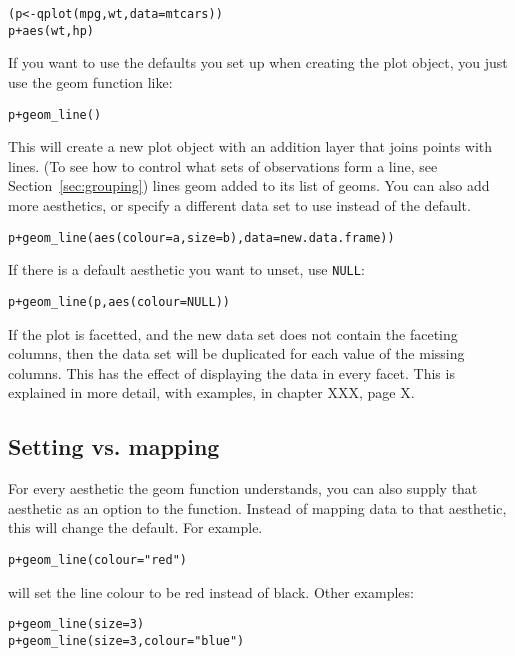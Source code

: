 \begin{alltt}
(p <- qplot(mpg, wt, data=mtcars))
p + aes(wt, hp)
\end{alltt}

If you want to use the defaults you set up when creating the plot object, you just use the geom function like:

\begin{alltt}
p + geom_line()
\end{alltt}

This will create a new plot object with an addition layer that joins points with lines.  (To see how to control what sets of observations form a line, see Section~\ref{sec:grouping}) lines geom added to its list of geoms.   You can also add more aesthetics, or specify a different data set to use instead of the default.  

\begin{alltt}
p + geom_line(aes(colour=a, size=b), data=new.data.frame))
\end{alltt}

If there is a default aesthetic you want to unset, use {\tt NULL}:

\begin{alltt}
p + geom_line(p, aes(colour=NULL))
\end{alltt}

If the plot is facetted, and the new data set does not contain the faceting columns, then the data set will be duplicated for each value of the missing columns.  This has the effect of displaying the data in every facet.  This is explained in more detail, with examples, in chapter XXX, page X.

\subsection{Setting vs. mapping}
\label{sub:setting-mapping}

For every aesthetic the geom function understands, you can also supply that aesthetic as an option to the function.  Instead of mapping data to that aesthetic, this will change the default.  For example.

\begin{alltt}
p + geom_line(colour="red")  
\end{alltt}

\noindent will set the line colour to be red instead of black.  Other examples:

\begin{alltt}
p + geom_line(size=3)  
p + geom_line(size=3, colour="blue")  
\end{alltt}

